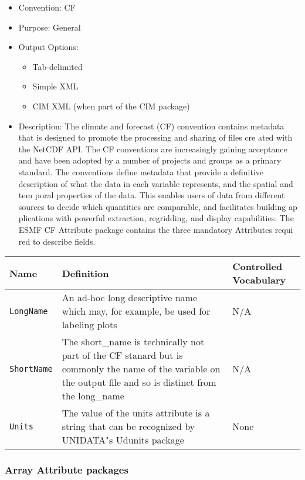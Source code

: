 \begin{itemize}
    \item Convention: CF
    \item Purpose: General
    \item Output Options:
    \begin{itemize}
        \item Tab-delimited
        \item Simple XML
        \item CIM XML (when part of the CIM package)
    \end{itemize} 
    \item  Description: The climate and forecast (CF) convention contains metadata that is designed to promote the processing and sharing of files cre
ated with the NetCDF API. The CF conventions are increasingly gaining acceptance and have been adopted by a number of projects and groups as a primary
 standard. The conventions define metadata that provide a definitive description of what the data in each variable represents, and the spatial and tem
poral properties of the data. This enables users of data from different sources to decide which quantities are comparable, and facilitates building ap
plications with powerful extraction, regridding, and display capabilities. The ESMF CF Attribute package contains the three mandatory Attributes requi
red to describe fields.  
\end{itemize}

\begin{tabular}{|p{5cm}|p{7cm}|p{5cm}|}
    {\bf Name } & {\bf Definition} & {\bf Controlled Vocabulary} \\
    \hline\hline
    {\tt LongName} & An ad-hoc long descriptive name which may, for example, be used for labeling plots & N/A\\
    {\tt ShortName}  & The short\_name is technically not part of the CF stanard but is commonly the name of the variable on the output file and so is
 distinct from the long\_name & N/A \\
    {\tt Units}  & The value of the units attribute is a string that can be recognized by UNIDATA"s Udunits package & None\\
\end{tabular}


\vspace{.20in}
\subsubsection{Array Attribute packages}
\label{ArrayAttributePackages}

